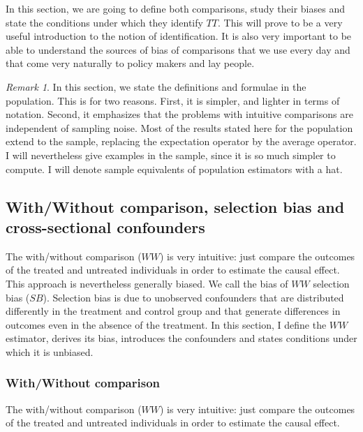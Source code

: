 \documentclass[
]{book}
\theoremstyle{definition}
\theoremstyle{definition}
\theoremstyle{definition}
\theoremstyle{definition}
\theoremstyle{remark}
\newtheorem*{remark}{Remark}
\begin{document}
In this section, we are going to define both comparisons, study their biases and state the conditions under which they identify \(TT\).
This will prove to be a very useful introduction to the notion of identification.
It is also very important to be able to understand the sources of bias of comparisons that we use every day and that come very naturally to policy makers and lay people.

\begin{remark}
\iffalse{} {Remark. } \fi{}In this section, we state the definitions and formulae in the population.
This is for two reasons.
First, it is simpler, and lighter in terms of notation.
Second, it emphasizes that the problems with intuitive comparisons are independent of sampling noise.
Most of the results stated here for the population extend to the sample, replacing the expectation operator by the average operator.
I will nevertheless give examples in the sample, since it is so much simpler to compute.
I will denote sample equivalents of population estimators with a hat.
\end{remark}

\hypertarget{withwithout-comparison-selection-bias-and-cross-sectional-confounders}{%
\subsection{With/Without comparison, selection bias and cross-sectional confounders}\label{withwithout-comparison-selection-bias-and-cross-sectional-confounders}}

The with/without comparison (\(WW\)) is very intuitive: just compare the outcomes of the treated and untreated individuals in order to estimate the causal effect.
This approach is nevertheless generally biased.
We call the bias of \(WW\) selection bias (\(SB\)).
Selection bias is due to unobserved confounders that are distributed differently in the treatment and control group and that generate differences in outcomes even in the absence of the treatment.
In this section, I define the \(WW\) estimator, derives its bias, introduces the confounders and states conditions under which it is unbiased.

\hypertarget{withwithout-comparison}{%
\subsubsection{With/Without comparison}\label{withwithout-comparison}}

The with/without comparison (\(WW\)) is very intuitive: just compare the outcomes of the treated and untreated individuals in order to estimate the causal effect.
\end{document}
